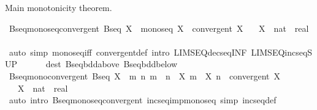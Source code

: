 \begin{isabellebody}
\endisatagproof
{\isafoldproof}%
%
\isadelimproof
%
\endisadelimproof
%
\begin{isamarkuptext}%
Main monotonicity theorem.%
\end{isamarkuptext}\isamarkuptrue%
\isamarkupfalse%
\ Bseq{\isacharunderscore}{\kern0pt}monoseq{\isacharunderscore}{\kern0pt}convergent{\isacharcolon}{\kern0pt}\ {\isachardoublequoteopen}Bseq\ X\ {\isasymLongrightarrow}\ monoseq\ X\ {\isasymLongrightarrow}\ convergent\ X{\isachardoublequoteclose}\isanewline
\ \ \ X\ {\isacharcolon}{\kern0pt}{\isacharcolon}{\kern0pt}\ {\isachardoublequoteopen}nat\ {\isasymRightarrow}\ real{\isachardoublequoteclose}\isanewline
%
\isadelimproof
\ \ %
\endisadelimproof
%
\isatagproof
{}\isamarkupfalse%
\ {\isacharparenleft}{\kern0pt}auto\ simp{\isacharcolon}{\kern0pt}\ monoseq{\isacharunderscore}{\kern0pt}iff\ convergent{\isacharunderscore}{\kern0pt}def\ intro{\isacharcolon}{\kern0pt}\ LIMSEQ{\isacharunderscore}{\kern0pt}decseq{\isacharunderscore}{\kern0pt}INF\ LIMSEQ{\isacharunderscore}{\kern0pt}incseq{\isacharunderscore}{\kern0pt}SUP\isanewline
\ \ \ \ \ \ dest{\isacharcolon}{\kern0pt}\ Bseq{\isacharunderscore}{\kern0pt}bdd{\isacharunderscore}{\kern0pt}above\ Bseq{\isacharunderscore}{\kern0pt}bdd{\isacharunderscore}{\kern0pt}below{\isacharparenright}{\kern0pt}%
\endisatagproof
{\isafoldproof}%
%
\isadelimproof
\isanewline
%
\endisadelimproof
\isanewline
{}\isamarkupfalse%
\ Bseq{\isacharunderscore}{\kern0pt}mono{\isacharunderscore}{\kern0pt}convergent{\isacharcolon}{\kern0pt}\ {\isachardoublequoteopen}Bseq\ X\ {\isasymLongrightarrow}\ {\isacharparenleft}{\kern0pt}{\isasymforall}m\ n{\isachardot}{\kern0pt}\ m\ {\isasymle}\ n\ {\isasymlongrightarrow}\ X\ m\ {\isasymle}\ X\ n{\isacharparenright}{\kern0pt}\ {\isasymLongrightarrow}\ convergent\ X{\isachardoublequoteclose}\isanewline
\ \ \ X\ {\isacharcolon}{\kern0pt}{\isacharcolon}{\kern0pt}\ {\isachardoublequoteopen}nat\ {\isasymRightarrow}\ real{\isachardoublequoteclose}\isanewline
%
\isadelimproof
\ \ %
\endisadelimproof
%
\isatagproof
{}\isamarkupfalse%
\ {\isacharparenleft}{\kern0pt}auto\ intro{\isacharbang}{\kern0pt}{\isacharcolon}{\kern0pt}\ Bseq{\isacharunderscore}{\kern0pt}monoseq{\isacharunderscore}{\kern0pt}convergent\ incseq{\isacharunderscore}{\kern0pt}imp{\isacharunderscore}{\kern0pt}monoseq\ simp{\isacharcolon}{\kern0pt}\ incseq{\isacharunderscore}{\kern0pt}def{\isacharparenright}{\kern0pt}%
\endisatagproof
{\isafoldproof}%
%
\isadelimproof
\isanewline
%
\endisadelimproof
\isanewline

\end{isabellebody}
